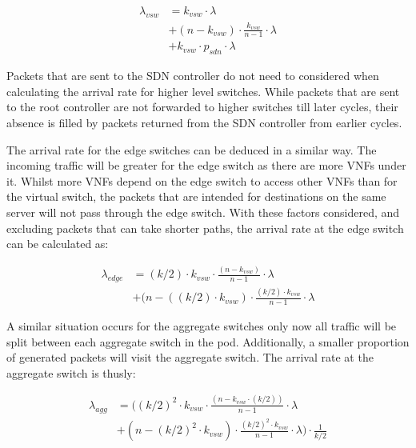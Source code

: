 \begin{equation}
\label{eq:arr_srv}
\begin{split}
\lambda_{vsw} &= k_{vsw} \cdot \lambda \\
			  &+ (n - k_{vsw}) \cdot  \frac{k_{vsw}}{n - 1} \cdot \lambda \\
			  &+ k_{vsw} \cdot p_{sdn} \cdot \lambda
\end{split}
\end{equation}

Packets that are sent to the SDN controller do not need to considered when calculating the arrival rate for higher level switches. While packets that are sent to the root controller are not forwarded to higher switches till later cycles, their absence is filled by packets returned from the SDN controller from earlier cycles.

The arrival rate for the edge switches can be deduced in a similar way. The incoming traffic will be greater for the edge switch as there are more VNFs under it. Whilst more VNFs depend on the edge switch to access other VNFs than for the virtual switch, the packets that are intended for destinations on the same server will not pass through the edge switch. With these factors considered, and excluding packets that can take shorter paths, the arrival rate at the edge switch can be calculated as:

\begin{equation}
\label{eq:arr_edge}
\begin{split}
\lambda_{edge} &= (k/2) \cdot k_{vsw} \cdot \frac{(n - k_{vsw})}{n - 1} \cdot \lambda \\
			   &+ (n - ((k/2) \cdot k_{vsw}) \cdot \frac{(k/2) \cdot k_{vsw}}{n - 1} \cdot \lambda 
\end{split}
\end{equation}

A similar situation occurs for the aggregate switches only now all traffic will be split between each aggregate switch in the pod. Additionally, a smaller proportion of generated packets will visit the aggregate switch. The arrival rate at the aggregate switch is thusly:

\begin{equation}
\label{eq:arr_agg}
\begin{split}
\lambda_{agg} &= \Big((k/2)^2 \cdot k_{vsw} \cdot \frac{(n - k_{vsw} \cdot (k/2))}{n - 1} \cdot \lambda\\
			  &+ (n - (k/2)^2 \cdot k_{vsw}) \cdot \frac{(k/2)^2 \cdot k_{vsw}}{n - 1} \cdot \lambda\Big) \cdot \frac{1}{k/2}
\end{split}
\end{equation}

